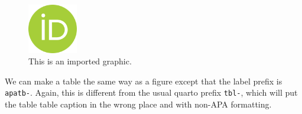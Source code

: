 \documentclass[
  jou,
  colorlinks=true,linkcolor=blue,citecolor=blue,urlcolor=blue]{apa7}
\begin{document}
\begin{figure}[h!]
\caption{This is an imported graphic.}
\label{apafg-importedgraphic}
\includegraphics[width=0.85in]{orcid.png}




\end{figure}

We can make a table the same way as a figure except that the label
prefix is \texttt{apatb-}. Again, this is different from the usual
quarto prefix \texttt{tbl-}, which will put the table table caption in
the wrong place and with non-APA formatting.
\end{document}
